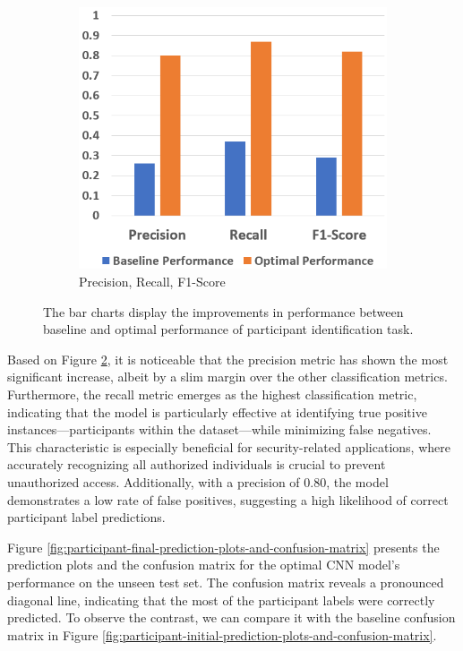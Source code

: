 \documentclass{l4proj}
\begin{document}
\begin{figure}[h]
\begin{subfigure}{0.4\textwidth}
        \includegraphics[width=\textwidth]{images/participant-configuration-comparison-barchart2.png}
        \caption{Precision, Recall, F1-Score}
        \label{fig:participant-configuration-comparison-barchart2}
    \end{subfigure}
    \caption{The bar charts display the improvements in performance between baseline and optimal performance of participant identification task.}
    \label{fig:participant-configuration-comparison}
\end{figure}

Based on Figure \ref{fig:participant-configuration-comparison}, it is noticeable that the precision metric has shown the most significant increase, albeit by a slim margin over the other classification metrics. Furthermore, the recall metric emerges as the highest classification metric, indicating that the model is particularly effective at identifying true positive instances—participants within the dataset—while minimizing false negatives. This characteristic is especially beneficial for security-related applications, where accurately recognizing all authorized individuals is crucial to prevent unauthorized access. Additionally, with a precision of 0.80, the model demonstrates a low rate of false positives, suggesting a high likelihood of correct participant label predictions.

Figure \ref{fig:participant-final-prediction-plots-and-confusion-matrix} presents the prediction plots and the confusion matrix for the optimal CNN model's performance on the unseen test set. The confusion matrix reveals a pronounced diagonal line, indicating that the most of the participant labels were correctly predicted. To observe the contrast, we can compare it with the baseline confusion matrix in Figure \ref{fig:participant-initial-prediction-plots-and-confusion-matrix}.
\end{document}
